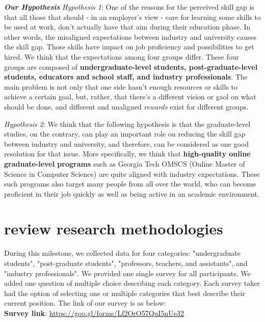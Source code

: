 \documentclass{sigchi}
\begin{document}
\textit{\textbf{Our Hypothesis}}\newline
\textit{Hypothesis 1}: One of the reasons for the perceived skill gap is that all those that should - in an employer's view - care for learning some skills to be used at work, don't actually have that aim during their education phase. In other words, the misaligned expectations between industry and university causes the skill gap. Those skills have impact on job proficiency and possibilities to get hired. We think that the expectations among four groups differ. These four groups are composed of \textbf{undergraduate-level students, post-graduate-level students, educators and school staff, and industry professionals}. The main problem is not only that one side hasn’t enough resources or skills to achieve a certain goal, but, rather, that there’s a different vision or gaol on what should be done, and different and unaligned \textit{rewards} exist for different groups.  

\textit{Hypothesis 2}:  We think that the following hypothesis is that the graduate-level studies, on the contrary, can play an important role on reducing the skill gap between industry and university, and therefore, can be considered as one good resolution for that issue. More specifically, we think that \textbf{high-quality online graduate-level programs} such as Georgia Tech OMSCS (Online Master of Science in Computer Science) are quite aligned with industry expectations. These such programs also target many people from all over the world, who can become proficient in their job quickly as well as being active in an academic environment.

\section{review research methodologies}
During this milestone, we collected data for four categories: "undergraduate students", "post-graduate students", "professors, teachers, and assistants", and "industry professionals".
We provided one single survey for all participants. We added one question of multiple choice describing each category. Each survey taker had the option of selecting one or multiple categories that best describe their current position. The link of our survey is as below:\\

\textbf{Survey link}: \url{https://goo.gl/forms/Lf2OrO57QuI5nUe32}\\
\end{document}
